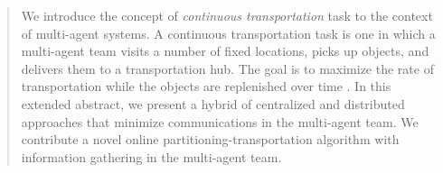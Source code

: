 \documentclass{aamas2016_extendedabstract}
\begin{document}


\maketitle

\begin{abstract}
We introduce the concept of \textit{continuous transportation} task to the context of multi-agent systems. A continuous
transportation task is one in which a multi-agent team visits a number of fixed locations, picks up objects, and delivers
them to a transportation hub. The goal is to maximize the rate of transportation while the objects are replenished over time
. In this extended abstract, we present a hybrid of centralized and distributed approaches that minimize
communications in the multi-agent team. We contribute a novel online partitioning-transportation algorithm with information gathering in the multi-agent team.
\end{abstract}




%
%

%
%
\printccsdesc



\end{document}
